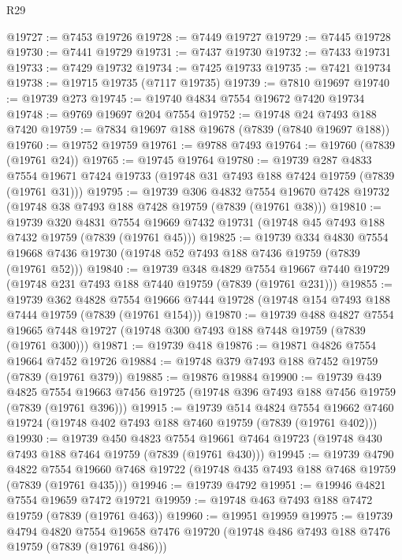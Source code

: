 \begin{lexlean}{R29}
\begin{coremodule}
@19727 := @7453 @19726
@19728 := @7449 @19727
@19729 := @7445 @19728
@19730 := @7441 @19729
@19731 := @7437 @19730
@19732 := @7433 @19731
@19733 := @7429 @19732
@19734 := @7425 @19733
@19735 := @7421 @19734
@19738 := @19715 @19735 (@7117 @19735)
@19739 := @7810 @19697
@19740 := @19739 @273
@19745 := @19740 @4834 @7554 @19672 @7420 @19734
@19748 := @9769 @19697 @204 @7554
@19752 := @19748 @24 @7493 @188 @7420
@19759 := @7834 @19697 @188 @19678 (@7839 (@7840 @19697 @188))
@19760 := @19752 @19759
@19761 := @9788 @7493
@19764 := @19760 (@7839 (@19761 @24))
@19765 := @19745 @19764
@19780 := @19739
    @287
    @4833
    @7554
    @19671
    @7424
    @19733
    (@19748 @31 @7493 @188 @7424 @19759 (@7839 (@19761 @31)))
@19795 := @19739
    @306
    @4832
    @7554
    @19670
    @7428
    @19732
    (@19748 @38 @7493 @188 @7428 @19759 (@7839 (@19761 @38)))
@19810 := @19739
    @320
    @4831
    @7554
    @19669
    @7432
    @19731
    (@19748 @45 @7493 @188 @7432 @19759 (@7839 (@19761 @45)))
@19825 := @19739
    @334
    @4830
    @7554
    @19668
    @7436
    @19730
    (@19748 @52 @7493 @188 @7436 @19759 (@7839 (@19761 @52)))
@19840 := @19739
    @348
    @4829
    @7554
    @19667
    @7440
    @19729
    (@19748 @231 @7493 @188 @7440 @19759 (@7839 (@19761 @231)))
@19855 := @19739
    @362
    @4828
    @7554
    @19666
    @7444
    @19728
    (@19748 @154 @7493 @188 @7444 @19759 (@7839 (@19761 @154)))
@19870 := @19739
    @488
    @4827
    @7554
    @19665
    @7448
    @19727
    (@19748 @300 @7493 @188 @7448 @19759 (@7839 (@19761 @300)))
@19871 := @19739 @418
@19876 := @19871 @4826 @7554 @19664 @7452 @19726
@19884 := @19748 @379 @7493 @188 @7452 @19759 (@7839 (@19761 @379))
@19885 := @19876 @19884
@19900 := @19739
    @439
    @4825
    @7554
    @19663
    @7456
    @19725
    (@19748 @396 @7493 @188 @7456 @19759 (@7839 (@19761 @396)))
@19915 := @19739
    @514
    @4824
    @7554
    @19662
    @7460
    @19724
    (@19748 @402 @7493 @188 @7460 @19759 (@7839 (@19761 @402)))
@19930 := @19739
    @450
    @4823
    @7554
    @19661
    @7464
    @19723
    (@19748 @430 @7493 @188 @7464 @19759 (@7839 (@19761 @430)))
@19945 := @19739
    @4790
    @4822
    @7554
    @19660
    @7468
    @19722
    (@19748 @435 @7493 @188 @7468 @19759 (@7839 (@19761 @435)))
@19946 := @19739 @4792
@19951 := @19946 @4821 @7554 @19659 @7472 @19721
@19959 := @19748 @463 @7493 @188 @7472 @19759 (@7839 (@19761 @463))
@19960 := @19951 @19959
@19975 := @19739
    @4794
    @4820
    @7554
    @19658
    @7476
    @19720
    (@19748 @486 @7493 @188 @7476 @19759 (@7839 (@19761 @486)))

\end{coremodule}
\end{lexlean}
